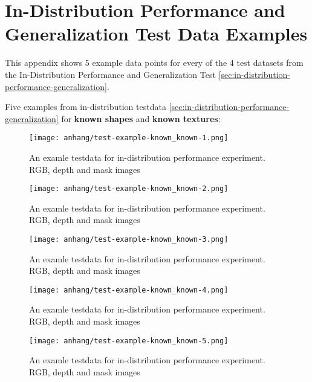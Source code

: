 \chapter{In-Distribution Performance and Generalization Test Data Examples}
\label{appendix:testdata-examples-in-distribution}

	This appendix shows 5 example data points for every of the 4 test datasets from the In-Distribution Performance and Generalization Test \ref{sec:in-distribution-performance-generalization}.
	
	Five examples from in-distribution testdata \ref{sec:in-distribution-performance-generalization} for \textbf{known shapes} and \textbf{known textures}:
	\begin{figure}[H]
		\centering
		\texttt{[image: anhang/test-example-known\_known-1.png]}
		\caption[An examle testdata for in-distribution performance experiment. RGB, depth and mask images]{An examle testdata for in-distribution performance experiment. RGB, depth and mask images}
	\end{figure}
	\begin{figure}[H]
		\centering
		\texttt{[image: anhang/test-example-known\_known-2.png]}
		\caption[An examle testdata for in-distribution performance experiment. RGB, depth and mask images]{An examle testdata for in-distribution performance experiment. RGB, depth and mask images}
	\end{figure}
	\begin{figure}[H]
		\centering
		\texttt{[image: anhang/test-example-known\_known-3.png]}
		\caption[An examle testdata for in-distribution performance experiment. RGB, depth and mask images]{An examle testdata for in-distribution performance experiment. RGB, depth and mask images}
	\end{figure}
	\begin{figure}[H]
		\centering
		\texttt{[image: anhang/test-example-known\_known-4.png]}
		\caption[An examle testdata for in-distribution performance experiment. RGB, depth and mask images]{An examle testdata for in-distribution performance experiment. RGB, depth and mask images}
	\end{figure}
	\begin{figure}[H]
		\centering
		\texttt{[image: anhang/test-example-known\_known-5.png]}
		\caption[An examle testdata for in-distribution performance experiment. RGB, depth and mask images]{An examle testdata for in-distribution performance experiment. RGB, depth and mask images}
	\end{figure}
	
